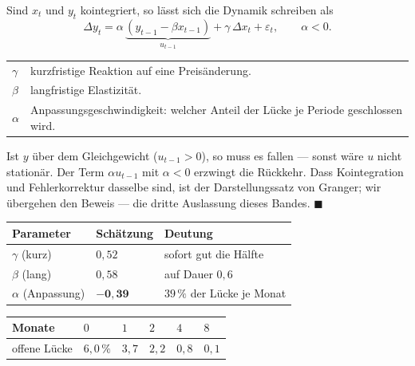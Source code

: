 \begin{merksatz}
Sind $x_t$ und $y_t$ kointegriert, so lässt sich die Dynamik schreiben als
\[ \Delta y_t = \alpha\,\underbrace{(y_{t-1}-\beta x_{t-1})}_{u_{t-1}} + \gamma\,\Delta x_t + \varepsilon_t, \qquad \alpha < 0 . \]

\begin{center}
{\small
\renewcommand{\arraystretch}{1.5}
\begin{tabular}{@{}P{1.4cm}P{7.0cm}@{}}
\toprule
$\gamma$ & kurzfristige Reaktion auf eine Preisänderung.\\
$\beta$ & langfristige Elastizität.\\
$\alpha$ & Anpassungsgeschwindigkeit: welcher Anteil der Lücke je Periode geschlossen wird.\\
\bottomrule
\end{tabular}}
\end{center}

Ist $y$ über dem Gleichgewicht ($u_{t-1}>0$), so muss es fallen --- sonst wäre $u$ nicht stationär. Der Term $\alpha u_{t-1}$ mit $\alpha<0$ erzwingt die Rückkehr. Dass Kointegration und Fehlerkorrektur dasselbe sind, ist der Darstellungssatz von Granger; wir übergehen den Beweis --- die dritte Auslassung dieses Bandes. $\blacksquare$

\begin{center}
{\small
\renewcommand{\arraystretch}{1.48}
\begin{tabular}{@{}P{3.0cm}P{2.0cm}P{3.0cm}@{}}
\toprule
\textbf{Parameter} & \textbf{Schätzung} & \textbf{Deutung}\\
\midrule
$\gamma$ (kurz) & $0{,}52$ & sofort gut die Hälfte\\
$\beta$ (lang) & $0{,}58$ & auf Dauer $0{,}6$\\
$\alpha$ (Anpassung) & $\mathbf{-0{,}39}$ & $39\,\%$ der Lücke je Monat\\
\bottomrule
\end{tabular}}
\end{center}

\begin{center}
{\small
\renewcommand{\arraystretch}{1.46}
\begin{tabular}{@{}P{2.0cm}P{1.4cm}P{1.4cm}P{1.4cm}P{1.4cm}P{1.4cm}@{}}
\toprule
\textbf{Monate} & $0$ & $1$ & $2$ & $4$ & $8$\\
\midrule
offene Lücke & $6{,}0\,\%$ & $3{,}7$ & $2{,}2$ & $0{,}8$ & $0{,}1$\\
\bottomrule
\end{tabular}}
\end{center}


\end{merksatz}
